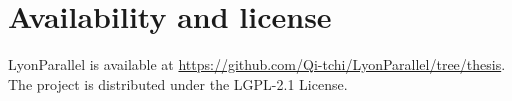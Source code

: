 
\section{Availability and license}

LyonParallel is available at \url{https://github.com/Qi-tchi/LyonParallel/tree/thesis}. The project is distributed under the LGPL-2.1 License.
